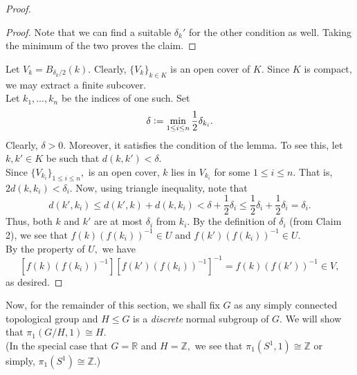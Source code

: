 \documentclass[12pt]{article}
\newenvironment{blockquote}
{\begin{mdframed}[skipabove=0pt, skipbelow=0pt, innertopmargin=4pt, innerbottommargin=4pt, bottomline=false,topline=false,rightline=false, linewidth=2pt]}
{\end{mdframed}}
\begin{document}
\begin{proof}
\begin{blockquote}
\begin{proof}
			Note that we can find a suitable $\delta_k'$ for the other condition as well. Taking the minimum of the two proves the claim.
		\end{proof}
	\end{blockquote}
	Let $V_k = B_{\delta_k/2}(k).$ Clearly, $\{V_k\}_{k \in K}$ is an open cover of $K.$ Since $K$ is compact, we may extract a finite subcover.\\
	Let $k_1, \ldots, k_n$ be the indices of one such. Set 
	\begin{equation*} 
		\delta \vcentcolon= \min_{1 \le i \le n} \dfrac{1}{2}\delta_{k_i}.
	\end{equation*}
	Clearly, $\delta > 0.$ Moreover, it satisfies the condition of the lemma. To see this, let $k, k' \in K$ be such that $d(k, k') < \delta.$\\
	Since $\{V_{k_i}\}_{1 \le i \le n},$ is an open cover, $k$ lies in $V_{k_i}$ for some $1 \le i \le n.$ That is, $2d(k, k_i) < \delta_i.$ Now, using triangle inequality, note that
	\begin{equation*} 
		d(k', k_i) \le d(k', k) + d(k, k_i) < \delta + \frac{1}{2}\delta_i \le \dfrac{1}{2}\delta_i + \dfrac{1}{2}\delta_i = \delta_i.
	\end{equation*}
	Thus, both $k$ and $k'$ are at most $\delta_i$ from $k_i.$ By the definition of $\delta_i$ (from Claim 2), we see that $f(k)(f(k_i))^{-1} \in U$ and $f(k')(f(k_i))^{-1} \in U.$\\
	By the property of $U,$ we have
	\begin{equation*} 
		\left[f(k)(f(k_i))^{-1}\right]\left[f(k')(f(k_i))^{-1}\right]^{-1} = f(k)(f(k'))^{-1} \in V,
	\end{equation*}
	as desired.
\end{proof}

Now, for the remainder of this section, we shall fix $G$ as any simply connected topological group and $H \le G$ is a \emph{discrete} normal subgroup of $G.$ We will show that $\pi_1(G/H, 1) \cong H.$\\
(In the special case that $G = \mathbb{R}$ and $H = \mathbb{Z},$ we see that $\pi_1(S^1, 1) \cong \mathbb{Z}$ or simply, $\pi_1(S^1) \cong \mathbb{Z}.$)
\end{document}
